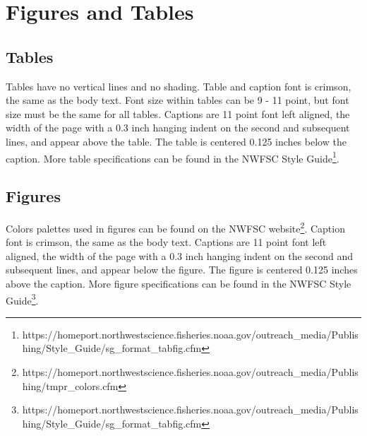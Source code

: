 \documentclass[12pt]{article}
\begin{document}
\section{Figures and Tables}
\subsection{Tables}
Tables have no vertical lines and no shading.  Table and caption font is crimson, the same as the body text. Font size within tables can be 9 - 11 point, but font size must be the same for all tables. Captions are 11 point font left aligned, the width of the page with a 0.3 inch hanging indent on the second and subsequent lines, and appear above the table.  The table is centered 0.125 inches below the caption.  More table specifications can be found in the NWFSC Style Guide\footnote{https://homeport.northwestscience.fisheries.noaa.gov/outreach\_media/Publishing/Style\_Guide/sg\_format\_tabfig.cfm}.
\subsection{Figures}
Colors palettes used in figures can be found on the NWFSC website\footnote{https://homeport.northwestscience.fisheries.noaa.gov/outreach\_media/Publishing/tmpr\_colors.cfm}.  Caption font is crimson, the same as the body text. Captions are 11 point font left aligned, the width of the page with a 0.3 inch hanging indent on the second and subsequent lines, and appear below the figure.  The figure is centered 0.125 inches above the caption.  More figure specifications can be found in the NWFSC Style Guide\footnote{https://homeport.northwestscience.fisheries.noaa.gov/outreach\_media/Publishing/Style\_Guide/sg\_format\_tabfig.cfm}.
\end{document}
